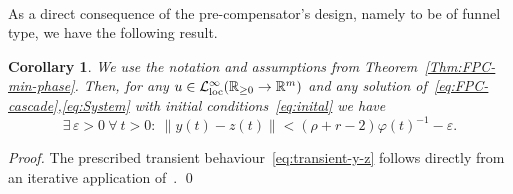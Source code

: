 \documentclass[ envcountsect, envcountsame]{svjour3}
\newtheorem{Corollary}[Theorem]{Corollary}
\newcommand{\R}{\mathbb{R}}
\newcommand{\cL}{\mathcal{L}}
\newcommand{\vp}{\varphi}
\newcommand{\ve}{\varepsilon}
\newcommand{\rp}{\mathbb{R}_{\geq 0}}
\begin{document}
\ \\
As a direct consequence of the pre-compensator's design, namely to be of funnel type, we have the following result.
\begin{Corollary}
We use the notation and assumptions from Theorem~\ref{Thm:FPC-min-phase}. 
Then, for any $u \in \cL_{\rm loc}^\infty(\rp \to \R^m)$ and any solution of~\eqref{eq:FPC-cascade},\eqref{eq:System} with initial conditions~\eqref{eq:inital} we have
\begin{equation} \label{eq:transient-y-z}
\exists\, \ve>0 \ \forall \ t>0: \ \|y(t) - z(t) \| <  (\rho + r-2) \vp(t)^{-1} - \ve.
\end{equation}
\end{Corollary}
\begin{proof}
The prescribed transient behaviour~\eqref{eq:transient-y-z} follows directly from an iterative application of~\cite[Prop.~1]{BergReis18b}.
\qed
\end{proof}
\end{document}
